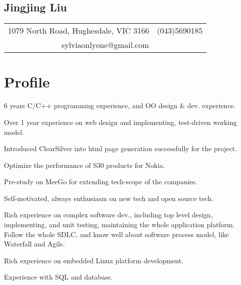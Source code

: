 \documentclass[a4paper,11pt]{article}
\begin{document}
\begin{comment}
This is cover letter field.
\end{comment}


\begin{center}
  \section*{Jingjing Liu}
  \begin{tabular}{l r}
    1079 North Road, Hughesdale, VIC 3166 & (043)5690185 \\
    \multicolumn{2}{c}{sylviaonlyone@gmail.com} \\
  \end{tabular}
\end{center}

\begin{comment}
\begin{tabular}{l l}
  Mobile:  & 0435690185 \\
  E-mail:  & sylviaonlyone@gmail.com \\
  Address: & Hughesdale, VIC 3166 \\
  \multicolumn{2}{l}{Australia Permanent Resident, 175 visa holder} \\
\end{tabular}
\end{comment}

\section*{Profile}
\begin{itemize*}
    \setlength\itemsep{0.4em}
  \item 6 years C/C++ programming experience, and OO design \& dev. experience.
  \item Over 1 year experience on web design and implementing, test-driven working model.
  \item Introduced ClearSilver into html page generation successfully for the project.
  \item Optimize the performance of S30 products for Nokia.
  \item Pre-study on MeeGo for extending tech-scope of the companies.
  \item Self-motivated, always enthusiasm on new tech and open source tech.
  \item Rich experience on complex software dev., including top level design, implementing, and unit testing, maintaining the whole application platform. Follow the whole SDLC, and know well about software process model, like Waterfall and Agile.
  \item Rich experience on embedded Linux platform development.
  \item Experience with SQL and database.
\end{itemize*}
\end{document}
